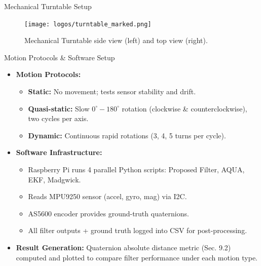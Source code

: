 \documentclass[aspectratio=169,xcolor=dvipsnames]{beamer}
\begin{document}
  \begin{frame}{Mechanical Turntable Setup}
  \begin{figure}
    \centering
    \texttt{[image: logos/turntable\_marked.png]}  
    \caption{Mechanical Turntable side view (left) and top view (right).}    
    \label{fig:turntable}
  \end{figure}
  \end{frame}
  
  
  \begin{frame}{Motion Protocols \& Software Setup}
  \begin{itemize}
      \item \textbf{Motion Protocols:}
      \begin{itemize}
          \item \textbf{Static:} No movement; tests sensor stability and drift.  
          \item \textbf{Quasi-static:} Slow $0^{\circ}\!\!-\!180^{\circ}$ rotation (clockwise \& counterclockwise), two cycles per axis.  
          \item \textbf{Dynamic:} Continuous rapid rotations (3, 4, 5 turns per cycle).
      \end{itemize}
  
      \item \textbf{Software Infrastructure:}  
      \begin{itemize}
          \item Raspberry Pi runs 4 parallel Python scripts: Proposed Filter, AQUA, EKF, Madgwick.  
          \item Reads MPU9250 sensor (accel, gyro, mag) via I2C.  
          \item AS5600 encoder provides ground-truth quaternions.  
          \item All filter outputs + ground truth logged into CSV for post-processing.
      \end{itemize}
  
      \item \textbf{Result Generation:}  
      Quaternion absolute distance metric (Sec. 9.2) computed and plotted to compare filter performance under each motion type.
  \end{itemize}
  \end{frame}
\end{document}
